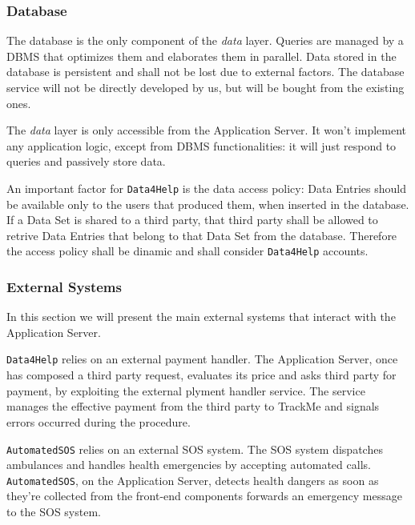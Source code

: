 \documentclass[../DD0.tex]{subfiles}
\begin{document}

      \subsubsection{Database}

        The database is the only component of the \textit{data} layer. Queries are managed by a DBMS that optimizes them and elaborates them in parallel. Data stored in the database is persistent and shall not be lost due to external factors. The database service will not be directly developed by us, but will be bought from the existing ones.

        The \textit{data} layer is only accessible from the Application Server. It won't implement any application logic, except from DBMS functionalities: it will just respond to queries and passively store data.

        An important factor for \texttt{Data4Help} is the data access policy: Data Entries should be available only to the users that produced them, when inserted in the database. If a Data Set is shared to a third party, that third party shall be allowed to retrive Data Entries that belong to that Data Set from the database. Therefore the access policy shall be dinamic and shall consider \texttt{Data4Help} accounts.


      \subsubsection{External Systems}

        In this section we will present the main external systems that interact with the Application Server.

        \texttt{Data4Help} relies on an external payment handler. The Application Server, once has composed a third party request, evaluates its price and asks third party for payment, by exploiting the external plyment handler service. The service manages the effective payment from the third party to TrackMe and signals errors occurred during the procedure.

        \texttt{AutomatedSOS} relies on an external SOS system. The SOS system dispatches ambulances and handles health emergencies by accepting automated calls. \texttt{AutomatedSOS}, on the Application Server, detects health dangers as soon as they're collected from the front-end components forwards an emergency message to the SOS system.
\end{document}
